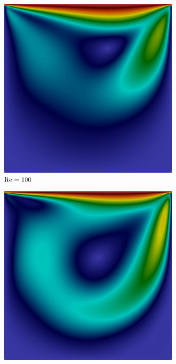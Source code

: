 \begin{figure}[h!]
    \centering
    \caption{Cavidade bidimensional - Campo de velocidade em regime estacionário.}
    \begin{subfigure}{0.32\textwidth}
        \includegraphics[width=\linewidth]{Figuras/Cavity/Re100.png}
        \caption{$\mathrm{Re}=100$}
    \end{subfigure}
    \begin{subfigure}{0.32\textwidth}
        \includegraphics[width=\linewidth]{Figuras/Cavity/Re400.png}

\end{subfigure}
\end{figure}
